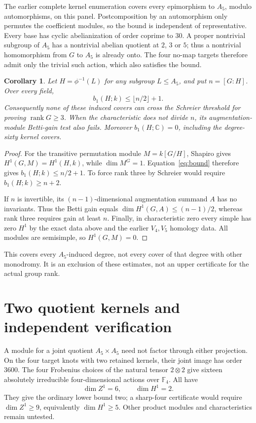\documentclass[11pt]{article}
\newtheorem{corollary}[theorem]{Corollary}
\newcommand{\F}{\mathbb F}
\newcommand{\C}{\mathbb C}
\newcommand{\rank}{\operatorname{rank}}
\begin{document}
The earlier complete kernel enumeration covers every epimorphism
to $A_5$, modulo automorphisms, on this panel. Postcomposition by
an automorphism only permutes the coefficient modules, so the bound
is independent of representative. Every base has cyclic
abelianization of order coprime to $30$. A proper nontrivial subgroup
of $A_5$ has a nontrivial abelian quotient at $2$, $3$ or $5$;
thus a nontrivial homomorphism from $G$ to $A_5$ is already onto.
The four no-map targets therefore admit only the trivial such
action, which also satisfies the bound.

\begin{corollary}\label{cor:covers}
Let $H=\phi^{-1}(L)$ for any subgroup $L\le A_5$, and put
$n=[G:H]$. Over every field,
\[
 b_1(H;k)\le\lfloor n/2\rfloor+1.
\]
Consequently none of these induced covers can cross the Schreier
threshold for proving $\rank G\ge3$. When the characteristic does
not divide $n$, its augmentation-module Betti-gain test also fails.
Moreover $b_1(H;\C)=0$, including the degree-sixty kernel covers.
\end{corollary}
\begin{proof}
For the transitive permutation module $M=k[G/H]$, Shapiro gives
$H^1(G,M)=H^1(H,k)$, while $\dim M^G=1$. Equation~\eqref{eq:bound}
therefore gives $b_1(H;k)\le n/2+1$. To force rank three by
Schreier would require $b_1(H;k)\ge n+2$.

If $n$ is invertible, its $(n-1)$-dimensional augmentation summand
$A$ has no invariants. Thus the Betti gain equals
$\dim H^1(G,A)\le(n-1)/2$, whereas rank three requires gain at
least $n$. Finally, in characteristic zero every simple has zero
$H^1$ by the exact data above and the earlier $V_4,V_5$ homology
data. All modules are semisimple, so $H^1(G,M)=0$.
\end{proof}

This covers every $A_5$-induced degree, not every cover of that
degree with other monodromy. It is an exclusion of these estimates,
not an upper certificate for the actual group rank.

\section{Two quotient kernels and independent verification}

A module for a joint quotient $A_5\times A_5$ need not factor through
either projection. On the four target knots with two retained
kernels, their joint image has order $3600$. The four Frobenius
choices of the natural tensor $2\otimes2$ give sixteen absolutely
irreducible four-dimensional actions over $\F_4$. All have
\[
 \dim Z^1=6,\qquad\dim H^1=2.
\]
They give the ordinary lower bound two; a sharp-four certificate
would require $\dim Z^1\ge9$, equivalently $\dim H^1\ge5$.
Other product modules and characteristics remain untested.
\end{document}
